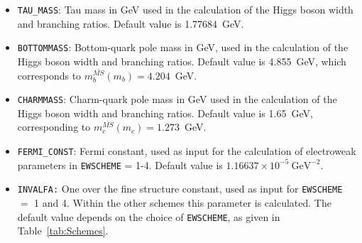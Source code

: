 \documentclass[a4paper,11pt]{article}
\begin{document}
\begin{itemize}
\item {\tt TAU\_MASS}: Tau mass in GeV used in the calculation of the Higgs boson
width and branching ratios. Default value is 1.77684~GeV. 
\item {\tt BOTTOMMASS}: Bottom-quark pole mass in GeV, used in the calculation
of the Higgs boson width and branching ratios. Default value is
4.855~GeV, which corresponds to $m_{b}^{\overline{MS}}(m_{b}) = 4.204$~GeV.
\item {\tt CHARMMASS}: Charm-quark pole mass in GeV used in the calculation of
the Higgs boson width and branching ratios. Default value is 1.65~GeV,
corresponding to $m_{c}^{\overline{MS}}(m_{c}) = 1.273$~GeV.
\item {\tt FERMI\_CONST}: Fermi constant, used as input for the calculation of
electroweak parameters in {\tt EWSCHEME} = 1-4. Default value is $1.16637 \times
10^{-5} \ \mathrm{GeV}^{-2}$. 
\item {\tt INVALFA:} One over the fine structure constant, used as input for
{\tt EWSCHEME} $=$ 1 and 4.  Within the other schemes this parameter is
calculated. The default value depends on the choice of {\tt EWSCHEME}, as given
in Table~\ref{tab:Schemes}.
\end{itemize} 
\end{document}
